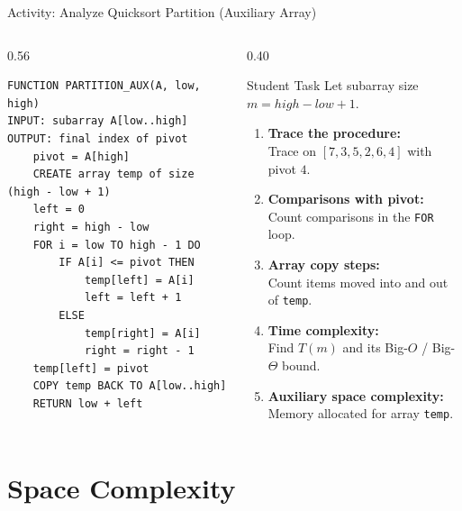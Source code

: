 \documentclass[aspectratio=169]{beamer}
\begin{document}
\begin{frame}[fragile]{Activity: Analyze Quicksort Partition (Auxiliary Array)}
  \scriptsize
  \begin{columns}[T]
    \begin{column}{0.56\textwidth}
\begin{lstlisting}[style=pseudonumbered,basicstyle=\ttfamily\tiny]
FUNCTION PARTITION_AUX(A, low, high)
INPUT: subarray A[low..high]
OUTPUT: final index of pivot
    pivot = A[high]
    CREATE array temp of size (high - low + 1)
    left = 0
    right = high - low
    FOR i = low TO high - 1 DO
        IF A[i] <= pivot THEN
            temp[left] = A[i]
            left = left + 1
        ELSE
            temp[right] = A[i]
            right = right - 1
    temp[left] = pivot
    COPY temp BACK TO A[low..high]
    RETURN low + left
\end{lstlisting}
    \end{column}
    \begin{column}{0.40\textwidth}
      \begin{block}{Student Task}
        \scriptsize
        Let subarray size $m = high - low + 1$.
        \begin{enumerate}\setlength{\itemsep}{0.25em}
          \item \textbf{Trace the procedure:}\\
            Trace on $[7, 3, 5, 2, 6, 4]$ with pivot $4$.
          \item \textbf{Comparisons with pivot:}\\
            Count comparisons in the \texttt{FOR} loop.
          \item \textbf{Array copy steps:}\\
            Count items moved into and out of \texttt{temp}.
          \item \textbf{Time complexity:}\\
            Find $T(m)$ and its Big-$O$ / Big-$\Theta$ bound.
          \item \textbf{Auxiliary space complexity:}\\
            Memory allocated for array \texttt{temp}.
        \end{enumerate}
      \end{block}
    \end{column}
  \end{columns}
\end{frame}

\section{Space Complexity}
\end{document}
